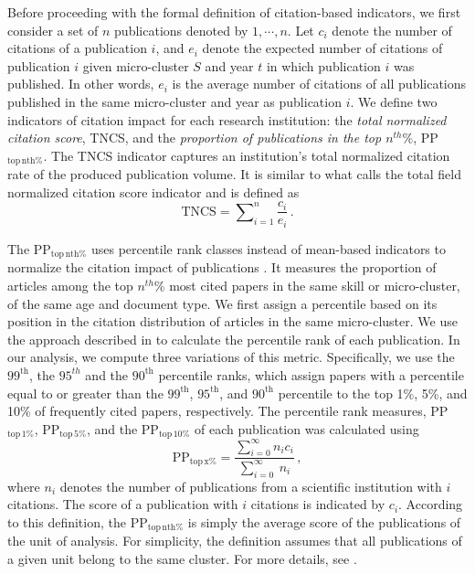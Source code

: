 \documentclass[draft,final]{vutinfth} %
\begin{document}
Before proceeding with the formal definition of citation-based indicators, we first consider a set of $n$ publications denoted by $1, \cdots, n$. Let $c_i$ denote the number of citations of a publication $i$, and $e_i$ denote the expected number of citations of publication $i$ given micro-cluster $S$ and year $t$ in which publication $i$ was published. In other words, $e_i$ is the average number of citations of all publications published in the same micro-cluster and year as publication $i$. We define two indicators of citation impact for each research institution: the {\em total normalized citation score}, TNCS, and the {\em proportion of publications in the top $n^{th}\%$}, PP$_\mathrm{top\,nth\%}$. The TNCS indicator captures an institution's total normalized citation rate of the produced publication volume. It is similar to what \cite{lundberg2007lifting} calls the total field normalized citation score indicator and is defined as
%
\begin{equation} \label{Eq.~5}
  \mathrm{TNCS} = \sum\nolimits_{i=1}^{n}\frac{c_i}{e_i} \, .
\end{equation}

%
The PP$_\mathrm{top\,nth\%}$ uses percentile rank classes instead of mean-based indicators to normalize the citation impact of publications \cite{bornmann2013use, waltman2012new, waltman2013calculation}. It measures the proportion of articles among the top $n^{th}$\% most cited papers in the same skill or micro-cluster, of the same age and document type. We first assign a percentile based on its position in the citation distribution of articles in the same micro-cluster. We use the approach described in \cite{waltman2013calculation} to calculate the percentile rank of each publication. In our analysis, we compute three variations of this metric. Specifically, we use the $99^\mathrm{th}$, the $95^{th}$ and the $90^\mathrm{th}$ percentile ranks, which assign papers with a percentile equal to or greater than the $99^\mathrm{{th}}$, $95^\mathrm{{th}}$, and $90^\mathrm{{th}}$ percentile to the top 1\%, 5\%, and 10\% of frequently cited papers, respectively. The percentile rank measures, PP$_\mathrm{top\,1\%}$, PP$_\mathrm{top\,5\%}$, and the PP$_\mathrm{top\,10\%}$ of each publication was calculated using
%
\begin{equation} \label{Eq.~6}
 \mathrm{ PP }_\mathrm{top\,x\%} = \frac{\sum_{i=0}^{\infty} n_i c_i} {\sum_{i=0}^{\infty}\ n_i} \, ,
\end{equation}
%
where $n_i$ denotes the number of publications from a scientific institution with $i$ citations. The score of a publication with $i$ citations is indicated by $c_i$. According to this definition, the PP$_\mathrm{top\,nth\%}$ is simply the average score of the publications of the unit of analysis. For simplicity, the definition assumes that all publications of a given unit belong to the same cluster. For more details, see \cite{waltman2013calculation, waltman2012leiden, waltman2011towards}. 
\end{document}
